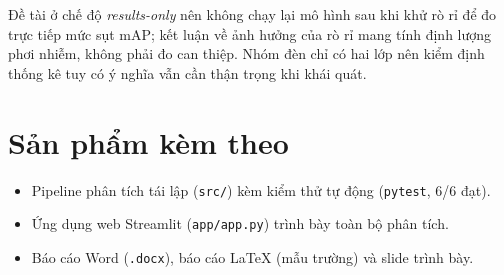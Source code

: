 Đề tài ở chế độ \textit{results-only} nên không chạy lại mô hình sau khi khử rò rỉ để đo trực
tiếp mức sụt mAP; kết luận về ảnh hưởng của rò rỉ mang tính định lượng phơi nhiễm, không phải đo
can thiệp. Nhóm đèn chỉ có hai lớp nên kiểm định thống kê tuy có ý nghĩa vẫn cần thận trọng khi
khái quát.

\section{Sản phẩm kèm theo}

\begin{itemize}
  \item Pipeline phân tích tái lập (\texttt{src/}) kèm kiểm thử tự động (\texttt{pytest}, 6/6 đạt).
  \item Ứng dụng web Streamlit (\texttt{app/app.py}) trình bày toàn bộ phân tích.
  \item Báo cáo Word (\texttt{.docx}), báo cáo LaTeX (mẫu trường) và slide trình bày.
\end{itemize}
